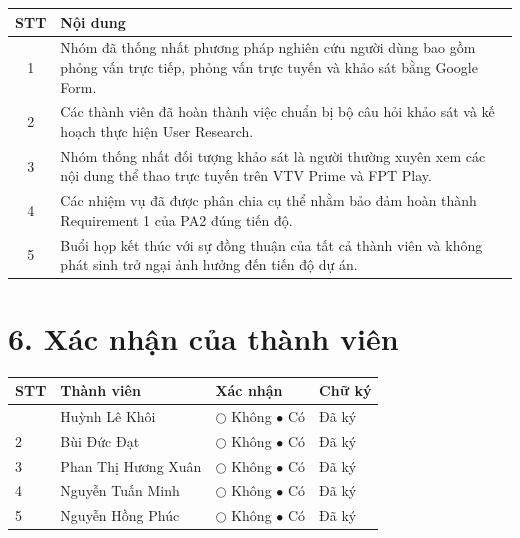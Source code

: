 \documentclass[11pt,a4paper]{article}
\begin{document}
\begin{tabularx}{\textwidth}{|c|X|}
\hline
\rowcolor{gray!20}
\textbf{STT} &
\textbf{Nội dung}\\
\hline

1 &
Nhóm đã thống nhất phương pháp nghiên cứu người dùng bao gồm phỏng vấn trực tiếp, phỏng vấn trực tuyến và khảo sát bằng Google Form.\\
\hline

2 &
Các thành viên đã hoàn thành việc chuẩn bị bộ câu hỏi khảo sát và kế hoạch thực hiện User Research.\\
\hline

3 &
Nhóm thống nhất đối tượng khảo sát là người thường xuyên xem các nội dung thể thao trực tuyến trên VTV Prime và FPT Play.\\
\hline

4 &
Các nhiệm vụ đã được phân chia cụ thể nhằm bảo đảm hoàn thành Requirement 1 của PA2 đúng tiến độ.\\
\hline

5 &
Buổi họp kết thúc với sự đồng thuận của tất cả thành viên và không phát sinh trở ngại ảnh hưởng đến tiến độ dự án.\\
\hline

\end{tabularx}


\section*{6. Xác nhận của thành viên}

\begin{tabularx}{\textwidth}{|>{\centering\arraybackslash}p{0.8cm}|X|>{\centering\arraybackslash}p{3.8cm}|>{\centering\arraybackslash}p{2.5cm}|}
\hline
\rowcolor{gray!20}
\textbf{STT} &
\centering\textbf{Thành viên} &
\textbf{Xác nhận} &
\textbf{Chữ ký}\\
\hline

1 &
Huỳnh Lê Khôi &
$\bigcirc$ Không \qquad $\bullet$ Có &
Đã ký\\
\hline

2 &
Bùi Đức Đạt &
$\bigcirc$ Không \qquad $\bullet$ Có &
Đã ký\\
\hline

3 &
Phan Thị Hương Xuân &
$\bigcirc$ Không \qquad $\bullet$ Có &
Đã ký\\
\hline

4 &
Nguyễn Tuấn Minh &
$\bigcirc$ Không \qquad $\bullet$ Có &
Đã ký\\
\hline

5 &
Nguyễn Hồng Phúc &
$\bigcirc$ Không \qquad $\bullet$ Có &
Đã ký\\
\hline

\end{tabularx}
\end{document}
